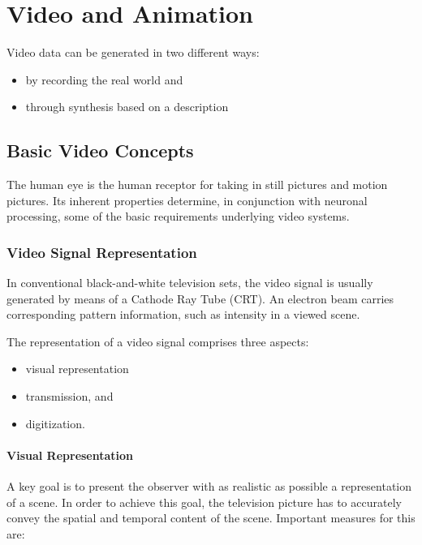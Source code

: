 \chapter{Video and Animation}
Video data can be generated in two different ways: 

\begin{itemize}
	\item by recording the real world and 
	\item through synthesis based on a description
\end{itemize}

\section{Basic Video Concepts}
The human eye is the human receptor for taking in still pictures and motion pictures. Its inherent properties determine, in conjunction with neuronal processing, some of the basic requirements underlying video systems.

\subsection{Video Signal Representation}
In conventional black-and-white television sets, the video signal is usually generated by means of a Cathode Ray Tube (CRT). An electron beam carries corresponding pattern information, such as intensity in a viewed scene.

The representation of a video signal comprises three aspects: 
\begin{itemize}
	\item visual representation
	\item transmission, and 
	\item digitization.
\end{itemize}
\subsubsection{Visual Representation} 
A key goal is to present the observer with as realistic as possible a representation of a scene. In order to achieve this goal, the television picture has to accurately convey the spatial and temporal content of the scene. Important measures for this are:


